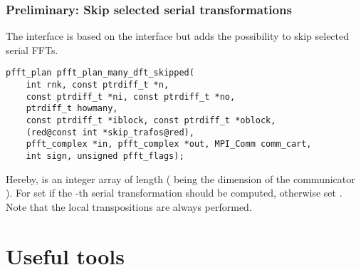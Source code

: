 \subsubsection{Preliminary: Skip selected serial transformations}
The  interface is based on the  interface but adds the possibility to skip selected serial FFTs.
\begin{lstlisting}[escapechar=§]
pfft_plan pfft_plan_many_dft_skipped(
    int rnk, const ptrdiff_t *n,
    const ptrdiff_t *ni, const ptrdiff_t *no,
    ptrdiff_t howmany,
    const ptrdiff_t *iblock, const ptrdiff_t *oblock,
    (red@const int *skip_trafos@red),
    pfft_complex *in, pfft_complex *out, MPI_Comm comm_cart,
    int sign, unsigned pfft_flags);
\end{lstlisting}
Hereby,  is an integer array of length  ( being the dimension of the communicator ).
For  set  if the -th serial transformation should be computed, otherwise set .
Note that the local transpositions are always performed.

\section{Useful tools}
